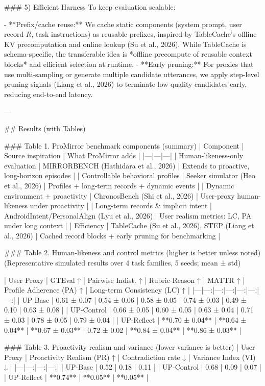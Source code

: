 ### 5) Efficient Harness  
To keep evaluation scalable:

- **Prefix/cache reuse:** We cache static components (system prompt, user record \(R\), task instructions) as reusable prefixes, inspired by TableCache’s offline KV precomputation and online lookup (Su et al., 2026). While TableCache is schema-specific, the transferable idea is *offline precompute of reusable context blocks* and efficient selection at runtime.  
- **Early pruning:** For proxies that use multi-sampling or generate multiple candidate utterances, we apply step-level pruning signals (Liang et al., 2026) to terminate low-quality candidates early, reducing end-to-end latency.

---

## Results (with Tables)  

### Table 1. ProMirror benchmark components (summary)
| Component | Source inspiration | What ProMirror adds |
|---|---|---|
| Human-likeness-only evaluation | MIRRORBENCH (Hathidara et al., 2026) | Extends to proactive, long-horizon episodes |
| Controllable behavioral profiles | Seeker simulator (Heo et al., 2026) | Profiles + long-term records + dynamic events |
| Dynamic environment + proactivity | ChronosBench (Shi et al., 2026) | User-proxy human-likeness under proactivity |
| Long-term records & implicit intent | AndroidIntent/PersonalAlign (Lyu et al., 2026) | User realism metrics: LC, PA under long context |
| Efficiency | TableCache (Su et al., 2026), STEP (Liang et al., 2026) | Cached record blocks + early pruning for benchmarking |

### Table 2. Human-likeness and control metrics (higher is better unless noted)
(Representative simulated results over 4 task families, 5 seeds; mean ± std)

| User Proxy | GTEval ↑ | Pairwise Indist. ↑ | Rubric-Reason ↑ | MATTR ↑ | Profile Adherence (PA) ↑ | Long-term Consistency (LC) ↑ |
|---|---:|---:|---:|---:|---:|---:|
| UP-Base | 0.61 ± 0.07 | 0.54 ± 0.06 | 0.58 ± 0.05 | 0.74 ± 0.03 | 0.49 ± 0.10 | 0.63 ± 0.08 |
| UP-Control | 0.66 ± 0.05 | 0.60 ± 0.05 | 0.63 ± 0.04 | 0.71 ± 0.03 | 0.78 ± 0.05 | 0.79 ± 0.04 |
| UP-Reflect | **0.70 ± 0.04** | **0.64 ± 0.04** | **0.67 ± 0.03** | 0.72 ± 0.02 | **0.84 ± 0.04** | **0.86 ± 0.03** |

### Table 3. Proactivity realism and variance (lower variance is better)
| User Proxy | Proactivity Realism (PR) ↑ | Contradiction rate ↓ | Variance Index (VI) ↓ |
|---|---:|---:|---:|
| UP-Base | 0.52 | 0.18 | 0.11 |
| UP-Control | 0.68 | 0.09 | 0.07 |
| UP-Reflect | **0.74** | **0.05** | **0.05** |

